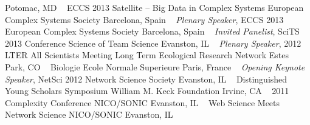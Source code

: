 Potomac, MD
\newline
~
\Gap
{}
ECCS 2013 Satellite -- Big Data in Complex Systems
\newline
    European Complex Systems Society
    \newline
Barcelona, Spain
\newline
~
\Gap
{}
\textit{Plenary Speaker}, ECCS 2013
\newline
    European Complex Systems Society
    \newline
Barcelona, Spain
\newline
~
\Gap
{}
\textit{Invited Panelist}, SciTS 2013 Conference
\newline
    Science of Team Science
    \newline
Evanston, IL
\newline
~
\Gap
{}
\textit{Plenary Speaker}, 2012 LTER All Scientists Meeting
\newline
    Long Term Ecological Research Network
    \newline
Estes Park, CO
\newline
~
\Gap
{}
Biologie
\newline
    Ecole Normale Superieure
    \newline
Paris, France
\newline
~
\Gap
{}
\textit{Opening Keynote Speaker}, NetSci 2012
\newline
    Network Science Society
    \newline
Evanston, IL
\newline
~
\Gap
{}
Distinguished Young Scholars Symposium
\newline
    William M. Keck Foundation
    \newline
Irvine, CA
\newline
~
\Gap
{}
2011 Complexity Conference
\newline
    NICO/SONIC 
    \newline
Evanston, IL
\newline
~
\Gap
{}
Web Science Meets Network Science
\newline
    NICO/SONIC 
    \newline
Evanston, IL
\newline
